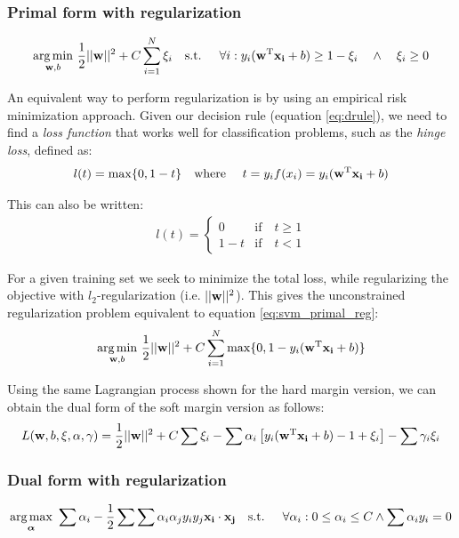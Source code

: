 \subsubsection*{Primal form with regularization}
\begin{align}\label{eq:svm_primal_reg} 
    \underset{\mathbf{w}, b}{\text{arg} \min}\ \frac{1}{2} ||\mathbf{w}||^2 + C \sum_{i=1}^{N} \xi_i
    \text{\quad s.t. \quad} 
    \forall i : y_i (\mathbf{w}^{\text{T}} \mathbf{x_i} + b) \ge 1 - \xi_i \quad \land \quad \xi_i \ge 0
\end{align}

An equivalent way to perform regularization is by using an empirical risk mini\-mization approach. Given our decision rule (equation \ref{eq:drule}), we need to find a \emph{loss function} that works well for classification problems, such as the \emph{hinge loss}, defined as:
\begin{align}
    l(t) = \max \{0, 1 - t\} \text{\quad where \quad} t = y_if(x_i) = y_i (\mathbf{w}^{\text{T}} \mathbf{x_i} + b)
\end{align}

This can also be written:
\begin{align*}
    l(t) = \left\{
        \begin{array}{ll}
            0   & \mbox{if} \quad t \ge 1 \\
            1-t & \mbox{if} \quad t < 1  
        \end{array}
    \right.
\end{align*}

For a given training set we seek to minimize the total loss, while regularizing the objective with $l_2$-regularization (i.e. $||\mathbf{w}||^2$). This gives the unconstrained reg\-u\-lar\-iza\-tion problem equivalent to equation \ref{eq:svm_primal_reg}:
\begin{align}
    \underset{\mathbf{w}, b}{\text{arg} \min}\ \frac{1}{2} ||\mathbf{w}||^2 + C \sum_{i=1}^{N} \max \{0, 1 -  y_i (\mathbf{w}^{\text{T}} \mathbf{x_i} + b)\}
\end{align}

Using the same Lagrangian process shown for the hard margin version, we can obtain the dual form of the soft margin version as follows:
\begin{align*}
    L(\mathbf{w}, b, \mathbf{\xi}, \mathbf{\alpha}, \mathbf{\gamma}) = 
    \frac{1}{2} ||\mathbf{w}||^2 + C \sum \xi_i
    - \sum \alpha_i \left[ y_i (\mathbf{w}^{\text{T}} \mathbf{x_i} + b) - 1 + \xi_i \right]
    - \sum \gamma_i \xi_i
\end{align*}

\subsubsection*{Dual form with regularization}
\begin{align}\label{eq:svm_dual_reg} 
    \underset{\boldsymbol{\alpha}}{\text{arg} \max}\ \sum \alpha_i - \frac{1}{2} \sum \sum \alpha_i \alpha_j y_i y_j \mathbf{x_i} \cdot \mathbf{x_j}
    \text{\quad s.t. \quad} \forall \alpha_i : 0 \le \alpha_i \le C \land \sum \alpha_i y_i = 0
\end{align}

